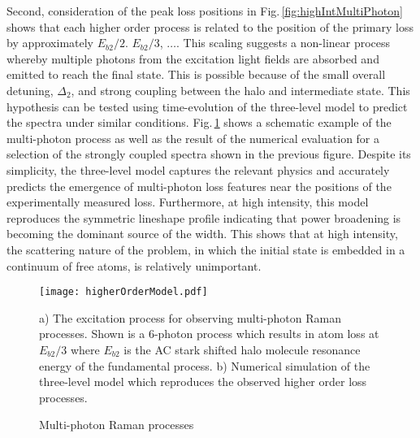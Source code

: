 Second, consideration of the peak loss positions in Fig.\,\ref{fig:highIntMultiPhoton} shows that each higher order process is related to the position of the primary loss by approximately $E_{b2}/2$. $E_{b2}/3$, $\dots$.
This scaling suggests a non-linear process whereby multiple photons from the excitation light fields are absorbed and emitted to reach the final state.
This is possible because of the small overall detuning, $\Delta_2$, and strong coupling between the halo and intermediate state.
This hypothesis can be tested using time-evolution of the three-level model to predict the spectra under similar conditions.
Fig.\,\ref{fig:multiPhotonTheory} shows a schematic example of the multi-photon process as well as the result of the numerical evaluation for a selection of the strongly coupled spectra shown in the previous figure.
Despite its simplicity, the three-level model captures the relevant physics and accurately predicts the emergence of multi-photon loss features near the positions of the experimentally measured loss.
Furthermore, at high intensity, this model reproduces the symmetric lineshape profile indicating that power broadening is becoming the dominant source of the width.
This shows that at high intensity, the scattering nature of the problem, in which the initial state is embedded in a continuum of free atoms, is relatively unimportant.
	\begin{figure} 
	\centerline{
	  \texttt{[image: higherOrderModel.pdf]}}
	  \caption{Multi-photon Raman processes}{a) The excitation process for observing multi-photon Raman processes. Shown is a 6-photon process which results in atom loss at $E_{b2}/3$ where $E_{b2}$ is the AC stark shifted halo molecule resonance energy of the fundamental process. b) Numerical simulation of the three-level model which reproduces the observed higher order loss processes.}
	  \label{fig:multiPhotonTheory}
	\end{figure}




%
%
%
%
%
	
